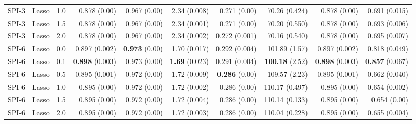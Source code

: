 \begin{table}
\begin{tabular}{rrrrrrrrrr}
  SPI-3 &     Lasso &   1.0 &          0.878 (0.00) &         0.967 (0.00) &         2.34 (0.008) &          0.271 (0.00) &          70.26 (0.424) &          0.878 (0.00) &         0.691 (0.015) \\
  SPI-3 &     Lasso &   1.5 &          0.878 (0.00) &         0.967 (0.00) &         2.34 (0.001) &          0.271 (0.00) &          70.20 (0.550) &          0.878 (0.00) &         0.693 (0.006) \\
  SPI-3 &     Lasso &   2.0 &          0.878 (0.00) &         0.967 (0.00) &         2.34 (0.002) &         0.272 (0.001) &          70.16 (0.540) &          0.878 (0.00) &         0.695 (0.007) \\
  SPI-6 &     Lasso &   0.0 &         0.897 (0.002) &  { \bf 0.973} (0.00) &         1.70 (0.017) &         0.292 (0.004) &          101.89 (1.57) &         0.897 (0.002) &         0.818 (0.049) \\
  SPI-6 &     Lasso &   0.1 &  { \bf 0.898} (0.003) &         0.973 (0.00) &  { \bf 1.69} (0.023) &         0.291 (0.004) &   { \bf 100.18} (2.52) &  { \bf 0.898} (0.003) &  { \bf 0.857} (0.067) \\
  SPI-6 &     Lasso &   0.5 &         0.895 (0.001) &         0.972 (0.00) &         1.72 (0.009) &   { \bf 0.286} (0.00) &          109.57 (2.23) &         0.895 (0.001) &         0.662 (0.040) \\
  SPI-6 &     Lasso &   1.0 &          0.895 (0.00) &         0.972 (0.00) &         1.72 (0.002) &          0.286 (0.00) &         110.17 (0.497) &          0.895 (0.00) &         0.654 (0.002) \\
  SPI-6 &     Lasso &   1.5 &          0.895 (0.00) &         0.972 (0.00) &         1.72 (0.004) &          0.286 (0.00) &         110.14 (0.133) &          0.895 (0.00) &          0.654 (0.00) \\
  SPI-6 &     Lasso &   2.0 &          0.895 (0.00) &         0.972 (0.00) &         1.72 (0.003) &          0.286 (0.00) &         110.04 (0.228) &          0.895 (0.00) &         0.655 (0.004) \\
\bottomrule
\end{tabular}
\end{table}
